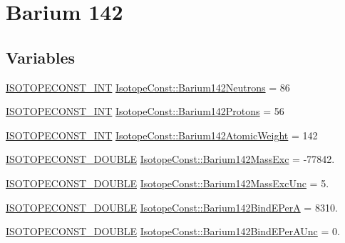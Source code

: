 \hypertarget{group___isotope_const-_barium-_ba142}{}\section{Barium 142}
\label{group___isotope_const-_barium-_ba142}
\subsection*{Variables}
\begin{DoxyCompactItemize}
\item 
\mbox{\hyperlink{group___isotope_const-_macros_ga5f18360b3e99483a35c32d789e62621c}{I\+S\+O\+T\+O\+P\+E\+C\+O\+N\+S\+T\+\_\+\+I\+NT}} \mbox{\hyperlink{group___isotope_const-_barium-_ba142_gad1356ca092812ff2c63635955790933d}{Isotope\+Const\+::\+Barium142\+Neutrons}} = 86
\item 
\mbox{\hyperlink{group___isotope_const-_macros_ga5f18360b3e99483a35c32d789e62621c}{I\+S\+O\+T\+O\+P\+E\+C\+O\+N\+S\+T\+\_\+\+I\+NT}} \mbox{\hyperlink{group___isotope_const-_barium-_ba142_ga54451972ffa5bf07a30934a1d0f22736}{Isotope\+Const\+::\+Barium142\+Protons}} = 56
\item 
\mbox{\hyperlink{group___isotope_const-_macros_ga5f18360b3e99483a35c32d789e62621c}{I\+S\+O\+T\+O\+P\+E\+C\+O\+N\+S\+T\+\_\+\+I\+NT}} \mbox{\hyperlink{group___isotope_const-_barium-_ba142_gac53bd9a5edd6110825717f7a5ec7b134}{Isotope\+Const\+::\+Barium142\+Atomic\+Weight}} = 142
\item 
\mbox{\hyperlink{group___isotope_const-_macros_ga8f45a7272ce02c0b4c65c44636ed719a}{I\+S\+O\+T\+O\+P\+E\+C\+O\+N\+S\+T\+\_\+\+D\+O\+U\+B\+LE}} \mbox{\hyperlink{group___isotope_const-_barium-_ba142_ga397bd0aa27e1ce1560732dabf1be90fa}{Isotope\+Const\+::\+Barium142\+Mass\+Exc}} = -\/77842.
\item 
\mbox{\hyperlink{group___isotope_const-_macros_ga8f45a7272ce02c0b4c65c44636ed719a}{I\+S\+O\+T\+O\+P\+E\+C\+O\+N\+S\+T\+\_\+\+D\+O\+U\+B\+LE}} \mbox{\hyperlink{group___isotope_const-_barium-_ba142_gaecc135051191384714dc26a61ed8f09f}{Isotope\+Const\+::\+Barium142\+Mass\+Exc\+Unc}} = 5.
\item 
\mbox{\hyperlink{group___isotope_const-_macros_ga8f45a7272ce02c0b4c65c44636ed719a}{I\+S\+O\+T\+O\+P\+E\+C\+O\+N\+S\+T\+\_\+\+D\+O\+U\+B\+LE}} \mbox{\hyperlink{group___isotope_const-_barium-_ba142_ga05b630db7874183192627870223135ae}{Isotope\+Const\+::\+Barium142\+Bind\+E\+PerA}} = 8310.
\item 
\mbox{\hyperlink{group___isotope_const-_macros_ga8f45a7272ce02c0b4c65c44636ed719a}{I\+S\+O\+T\+O\+P\+E\+C\+O\+N\+S\+T\+\_\+\+D\+O\+U\+B\+LE}} \mbox{\hyperlink{group___isotope_const-_barium-_ba142_ga33318bc3fc0492c7e229055de64e83e9}{Isotope\+Const\+::\+Barium142\+Bind\+E\+Per\+A\+Unc}} = 0.

\end{DoxyCompactItemize}

